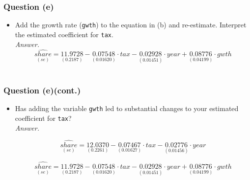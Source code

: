 \documentclass[11pt, xcolor=x11names,compress]{beamer}
\begin{document}
\begin{frame}
\frametitle{Question (e)}
\begin{itemize}
    \item Add the growth rate (\texttt{gwth}) to the equation in (b) and re-estimate. Interpret the estimated coefficient for \texttt{tax}.\\
\pause
\vspace{3mm}
\textit{Answer.}
\begin{equation*}
    \underset{(se)}{\widehat{share}} = \underset{(0.2187)}{11.9728} - \underset{(0.01620)}{0.07548} \cdot tax - \underset{(0.01451)}{0.02928}\cdot year + \underset{(0.04199)}{0.08776}\cdot gwth
\end{equation*}\\
\end{itemize}
\end{frame}

\begin{frame}
\frametitle{Question (e)(cont.)}
\begin{itemize}
    \item Has adding the variable \texttt{gwth} led to substantial changes to your estimated coefficient for \texttt{tax}? \\
\pause
\vspace{3mm}
\textit{Answer.}

\begin{equation*}
    \underset{(se)}{\widehat{share}} = \underset{(0.2261)}{12.0370} - \underset{(0.01627)}{0.07467} \cdot tax - \underset{(0.01456)}{0.02776}\cdot year
\end{equation*}

\begin{equation*}
    \underset{(se)}{\widehat{share}} = \underset{(0.2187)}{11.9728} - \underset{(0.01620)}{0.07548} \cdot tax - \underset{(0.01451)}{0.02928}\cdot year + \underset{(0.04199)}{0.08776}\cdot gwth
\end{equation*}\\
\end{itemize}
\end{frame}
\end{document}
